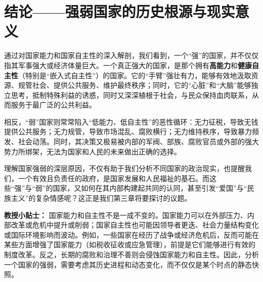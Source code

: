 \hrulefill

\section{结论——强弱国家的历史根源与现实意义}

通过对国家能力和国家自主性的深入解剖，我们看到，一个“强”的国家，并不仅仅指其军事强大或经济体量巨大。一个真正强大的国家，是那个拥有\textbf{高能力}和\textbf{健康自主性}（特别是“嵌入式自主性”）的国家。它的“手臂”强壮有力，能够有效地汲取资源、规管社会、提供公共服务、维护最终秩序；同时，它的“心脏”和“大脑”能够独立思考，抵制特殊利益的诱惑，同时又深深植根于社会，与民众保持血肉联系，从而服务于最广泛的公共利益。

相反，“弱”国家则常常陷入“低能力、低自主性”的恶性循环：无力征税，导致无钱提供公共服务；无力规管，导致市场混乱、腐败横行；无力维持秩序，导致暴力频发、社会动荡。同时，其决策又极易被内部的军阀、部族、腐败官员或外部的强大势力所绑架，无法为国家和人民的未来做出正确的选择。

理解国家强弱的深层原因，不仅有助于我们分析不同国家的政治现实，也提醒我们，一个有效且负责任的政府，是国家发展和人民福祉的基石。而这些“强”与“弱”的国家，又如何在其内部构建起共同的认同，甚至引发“爱国”与“民族主义”的复杂情感呢？这正是我们第三章将要探讨的议题。

\textbf{教授小贴士：}
国家能力和自主性不是一成不变的。国家能力可以在外部压力、内部改革或危机中提升或削弱；国家自主性也可能因领导者更迭、社会力量结构变化或国际环境影响而波动。例如，一些国家在经历了战争或经济危机后，反而可能在某些方面增强了国家能力（如税收征收或应急管理），前提是它们能够进行有效的制度改革。反之，长期的腐败和治理不善则会侵蚀国家能力和自主性。因此，分析一个国家的强弱，需要考虑其历史进程和动态变化，而不仅仅是某个时点的静态快照。
